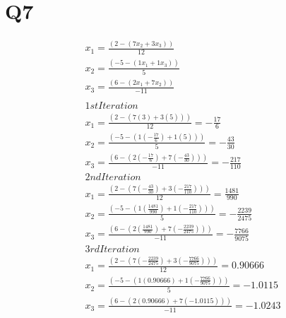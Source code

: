 \documentclass[11pt]{article} %
\begin{document}
\section{Q7}
\begin{equation}
\begin{split}
x_1 = \frac{(2-(7x_2 + 3x_3))}{12} \\
x_2 = \frac{(-5-(1x_1 + 1x_3))}{5} \\
x_3 = \frac{(6-(2x_1 + 7x_2))}{-11}\\ \\
1st Iteration\\
x_1 = \frac{(2-(7(3)+ 3(5)))}{12} = -\frac{17}{6}\\
x_2 = \frac{(-5-(1(-\frac{17}{6}) + 1(5)))}{5} = -\frac{43}{30}\\
x_3 = \frac{(6-(2(-\frac{17}{6}) + 7(-\frac{43}{30})))}{-11}= -\frac{217}{110}\\
2nd Iteration \\ 
x_1 = \frac{(2-(7(-\frac{43}{30})+ 3( -\frac{217}{110})))}{12} = \frac{1481}{990}\\
x_2 = \frac{(-5-(1( \frac{1481}{990}) + 1( -\frac{217}{110})))}{5} = -\frac{2239}{2475}\\
x_3 = \frac{(6-(2( \frac{1481}{990}) + 7(-\frac{2239}{2475})))}{-11}= -\frac{7766}{9075}\\
3rd Iteration \\
x_1 = \frac{(2-(7( -\frac{2239}{2475})+ 3(-\frac{7766}{9075})))}{12} = 0.90666\\
x_2 = \frac{(-5-(1( 0.90666) + 1(-\frac{7766}{9075})))}{5} = -1.0115 \\
x_3 = \frac{(6-(2( 0.90666 ) + 7(-1.0115)))}{-11}= -1.0243\\
\end{split}
\end{equation}
\end{document}
